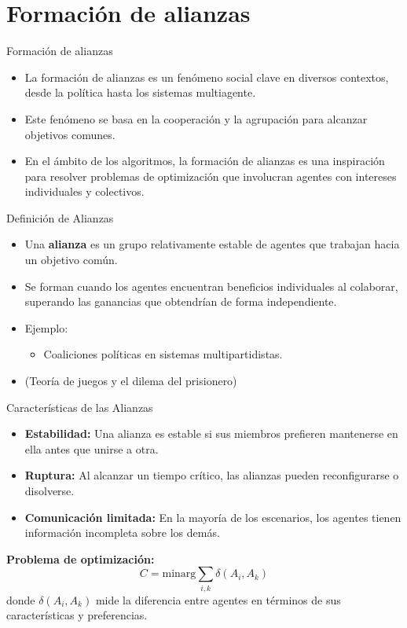 \documentclass{beamer}
\begin{document}
\section{Formación de alianzas}

\begin{frame}{Formación de alianzas}
    \begin{itemize}
        \item La formación de alianzas es un fenómeno social clave en diversos contextos, desde la política hasta los sistemas multiagente.
        \item Este fenómeno se basa en la cooperación y la agrupación para alcanzar objetivos comunes.
        \item En el ámbito de los algoritmos, la formación de alianzas es una inspiración para resolver problemas de optimización que involucran agentes con intereses individuales y colectivos.
    \end{itemize}
\end{frame}

\begin{frame}{Definición de Alianzas}
    \begin{itemize}
        \item Una \textbf{alianza} es un grupo relativamente estable de agentes que trabajan hacia un objetivo común.
        \item Se forman cuando los agentes encuentran beneficios individuales al colaborar, superando las ganancias que obtendrían de forma independiente.
        \item Ejemplo:
        \begin{itemize}
            \item Coaliciones políticas en sistemas multipartidistas.
        \end{itemize}

    \item (Teoría de juegos y el dilema del prisionero)
    \end{itemize}
\end{frame}

\begin{frame}{Características de las Alianzas}
    \begin{itemize}
        \item \textbf{Estabilidad:} Una alianza es estable si sus miembros prefieren mantenerse en ella antes que unirse a otra.
        \item \textbf{Ruptura:} Al alcanzar un tiempo crítico, las alianzas pueden reconfigurarse o disolverse.
        \item \textbf{Comunicación limitada:} En la mayoría de los escenarios, los agentes tienen información incompleta sobre los demás.
    \end{itemize}
    
    \textbf{Problema de optimización:}
    \[
    C = \text{minarg} \sum_{i,k} \delta (A_i, A_k)
    \]
    donde \( \delta(A_i, A_k) \) mide la diferencia entre agentes en términos de sus características y preferencias.
\end{frame}
\end{document}
